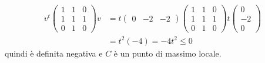 \documentclass[a4paper]{article}
\begin{document}
\begin{snippetexercise}{}
    \begin{align*}
        v^t \begin{pmatrix}
            1 & 1 & 0 \\ 1 & 1 & 1 \\ 0 & 1 & 0
        \end{pmatrix} v
        &= t \begin{pmatrix} 0 & -2 & -2 \end{pmatrix}
        \begin{pmatrix}
            1 & 1 & 0 \\ 1 & 1 & 1 \\ 0 & 1 & 0
        \end{pmatrix}
        t \begin{pmatrix} 0 \\ -2 \\ 0 \end{pmatrix} \\
        &= t^2(-4) = -4t^2 \leq 0
    \end{align*}
    quindi è definita negativa e \(C\) è un punto di massimo locale.
\end{snippetexercise}

\end{document}
